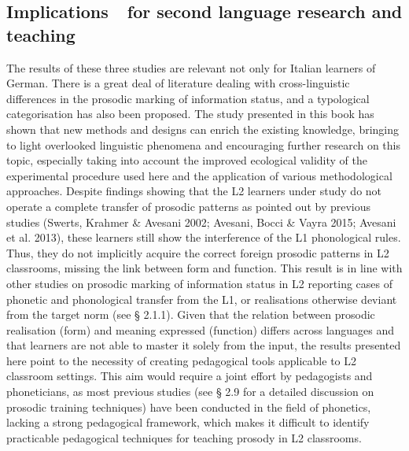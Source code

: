 \subsection[Implications\ \ for second language research and teaching]{Implications\ \ for second language research and teaching}
\hypertarget{Toc191305965}{}\begin{stylecaption}
\textup{The results of these three studies are relevant not only for Italian learners of German. There is a great deal of literature dealing with cross-linguistic differences in the prosodic marking of information status, and a typological categorisation has also been proposed. The study presented in this book has shown that new methods and designs can enrich the existing knowledge, bringing to light overlooked linguistic phenomena and encouraging further research on this topic, especially taking into account the improved ecological validity of the experimental procedure used here and the application of various methodological approaches. Despite findings showing that the L2 learners under study do not operate a complete transfer of prosodic patterns as pointed out by previous studies }\textup{(Swerts, Krahmer \& Avesani 2002; Avesani, Bocci \& Vayra 2015; Avesani et al. 2013)}\textup{, these learners still show the interference of the L1 phonological rules. Thus, they do not implicitly acquire the correct foreign prosodic patterns in L2 classrooms, missing the link between form and function. This result is in line with other studies on prosodic marking of information status in L2 reporting cases of phonetic and phonological transfer from the L1, or realisations otherwise deviant from the target norm (see § 2.1.1). Given that the relation between prosodic realisation (form) and meaning expressed (function) differs across languages and that learners are not able to master it solely from the input, the results presented here point to the necessity of creating pedagogical tools applicable to L2 classroom settings. This aim would require a joint effort by pedagogists and phoneticians, as most previous studies (see § 2.9 for a detailed discussion on prosodic training techniques) have been conducted in the field of phonetics, lacking a strong pedagogical framework, which makes it difficult to identify practicable pedagogical techniques for teaching prosody in L2 classrooms.}
\end{stylecaption}

